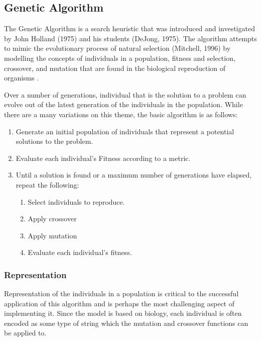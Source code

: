 \newcommand{\tab}{\hspace*{2em}}

\subsection{Genetic Algorithm}
 The Genetic Algorithm is a search heuristic that was introduced and investigated by John Holland (1975) 
and his students (DeJong, 1975). The algorithm attempts to mimic the evolutionary process of natural 
selection (Mitchell, 1996) by modelling the concepts of individuals in a population, fitness and selection, 
crossover, and mutation that are found in the biological reproduction of organisms \cite{Mitchell1996}. 

Over a number of generations, individual that is the solution to a problem can 
evolve out of the latest generation of the individuals in the population. While there are a many variations 
on this theme, the basic algorithm is as follows:
\begin{enumerate}
 \item Generate an initial population of individuals that represent a potential solutions to the problem.  
 \item Evaluate each individual's Fitness according to a metric.
 \item Until a solution is found or a maximum number of generations have elapsed, repeat the following:
  \begin{enumerate}
   \item Select individuals to reproduce.
   \item Apply crossover
   \item Apply mutation
   \item Evaluate each individual's fitness.
  \end{enumerate}

\end{enumerate}


\subsubsection{Representation}

Representation of the individuals in a population is critical to the successful application of this algorithm and is 
perhaps the most challenging aspect of implementing it. Since the model is based on biology, each individual is often 
encoded as some type of string which the mutation and crossover functions can be applied to. 

